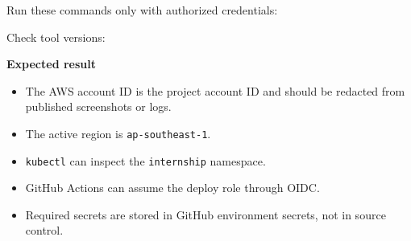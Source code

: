 Run these commands only with authorized credentials:

\begin{Shaded}
\begin{Highlighting}[]
\end{Highlighting}
\end{Shaded}

Check tool versions:

\begin{Shaded}
\begin{Highlighting}[]
 
 
 
 
 
 
\end{Highlighting}
\end{Shaded}

\vspace{0.5em}\noindent\textbf{Expected result}\par

\begin{itemize}
\tightlist
\item
  The AWS account ID is the project account ID and should be redacted
  from published screenshots or logs.
\item
  The active region is \texttt{ap-\allowbreak{}southeast-\allowbreak{}1}.
\item
  \texttt{kubectl} can inspect the \texttt{internship} namespace.
\item
  GitHub Actions can assume the deploy role through OIDC.
\item
  Required secrets are stored in GitHub environment secrets, not in
  source control.
\end{itemize}

